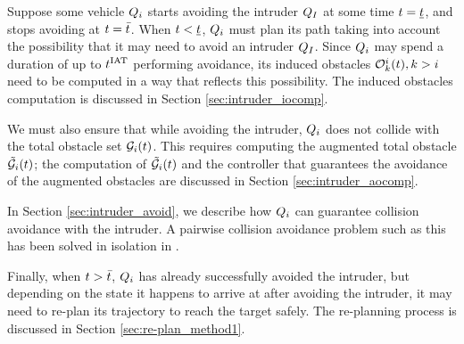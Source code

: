 Suppose some vehicle $Q_i$ starts avoiding the intruder $Q_{I}$ at some time $t = \underline{t}$, and stops avoiding at $t = \bar{t}$. When $t < \underline{t}$, $Q_i$ must plan its path taking into account the possibility that it may need to avoid an intruder $Q_I$. Since $Q_i$ may spend a duration of up to $t^\text{IAT}$ performing avoidance, its induced obstacles $\mathcal{O}_k^i(t), k>i$ need to be computed in a way that reflects this possibility. The induced obstacles computation is discussed in Section \ref{sec:intruder_iocomp}.

We must also ensure that while avoiding the intruder, $Q_i$ does not collide with the total obstacle set $\mathcal{G}_i(t)$. This requires computing the augmented total obstacle $\tilde{\mathcal{G}}_i(t)$; the computation of $\tilde{\mathcal{G}}_i(t)$ and the controller that guarantees the avoidance of the augmented obstacles are discussed in Section \ref{sec:intruder_aocomp}.

In Section \ref{sec:intruder_avoid}, we describe how $Q_i$ can guarantee collision avoidance with the intruder. A pairwise collision avoidance problem such as this has been solved in isolation in \cite{Mitchell05}.

Finally, when $t > \bar{t}$, $Q_i$ has already successfully avoided the intruder, but depending on the state it happens to arrive at after avoiding the intruder, it may need to re-plan its trajectory to reach the target safely. The re-planning process is discussed in Section \ref{sec:re-plan_method1}.

